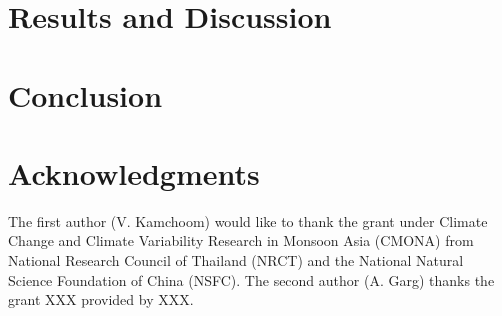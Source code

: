 \documentclass[12pt,a4paper]{article}
\begin{document}
	
	\section{Results and Discussion}
	
	
	
	\section{Conclusion}
	
	\section*{Acknowledgments}
	
	The first author (V. Kamchoom) would like to thank the grant under Climate Change and Climate Variability Research in Monsoon Asia (CMONA) from National Research Council of Thailand (NRCT) and the National Natural Science Foundation of China (NSFC). The second author (A. Garg) thanks the grant XXX provided by XXX. 
	
	
	
	\nolinenumbers
\end{document}
